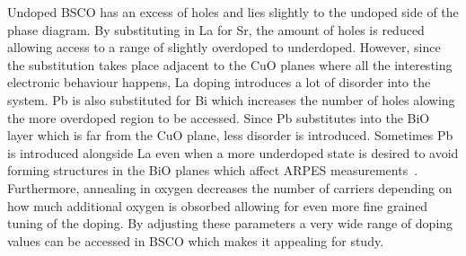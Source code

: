 Undoped \ac{BSCO} has an excess of holes and lies slightly to the undoped side of the phase diagram. By substituting in La for Sr, the amount of holes is reduced allowing access to a range of slightly overdoped to underdoped. However, since the substitution takes place adjacent to the CuO planes where all the interesting electronic behaviour happens, La doping introduces a lot of disorder into the system. Pb is also substituted for Bi which increases the number of holes alowing the more overdoped region to be accessed. Since Pb substitutes into the BiO layer which is far from the CuO plane, less disorder is introduced. Sometimes Pb is introduced alongside La even when a more underdoped state is desired to avoid forming structures in the BiO planes which affect \ac{ARPES} measurements~\cite{Kondo2007}. Furthermore, annealing in oxygen decreases the number of carriers depending on how much additional oxygen is obsorbed allowing for even more fine grained tuning of the doping. By adjusting these parameters a very wide range of doping values can be accessed in \ac{BSCO} which makes it appealing for study.

